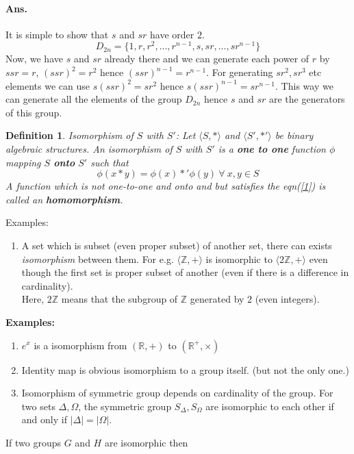 \documentclass[12pt]{report}
\newtheorem{defn}{Definition}
\begin{document}
\paragraph*{Ans. } It is simple to show that $s$ and $sr$ have order $2$. 
$$ D_{2n} = \{1, r, r^2, \dots, r^{n-1}, s, sr, \dots, sr^{n-1}\}$$
Now, we have $s$ and $sr$ already there and we can generate each power of $r$ by $ssr = r$, $(ssr)^2 = r^2$ hence $(ssr)^{n-1} = r^{n-1}$. For generating $sr^2, sr^3$ etc elements we can use $s(ssr)^2 = sr^2$ hence $s(ssr)^{n-1} = sr^{n-1}$. This way we can generate all the elements of the group $D_{2n}$ hence $s$ and $sr$ are the generators of this group.
\begin{defn}
    Isomorphism of $S$ with $S'$: Let $\langle S, *\rangle$ and $\langle S', *'\rangle$ be binary algebraic structures. An isomorphism of $S$ with $S'$ is a \textbf{one to one }function $\phi$ mapping $S$ \textbf{onto} $S'$ such that
    \begin{equation} \label{1}
        \phi(x * y) = \phi(x) *' \phi(y)~\forall~ x,y \in S
    \end{equation}
    A function which is not one-to-one and onto and but satisfies the eqn(\ref{1}) is called an \textbf{homomorphism}.
\end{defn}
Examples:
\begin{enumerate}
    \item A set which is subset (even proper subset) of another set, there can exists {\em isomorphism} between them. For e.g. $\langle \mathbb{Z}, + \rangle$ is isomorphic to $\langle 2\mathbb{Z}, + \rangle$ even though the first set is proper subset of another (even if there is a difference in cardinality).\\
    Here, $2\mathbb{Z}$ means that the subgroup of $\mathbb{Z}$ generated by $2$ (even integers).
\end{enumerate} 
\textbf{Examples:}
\begin{enumerate}
    \item $e^x$ is a isomorphism from $(\mathbb{R},+)$ to $(\mathbb{R^+},\times)$
    \item Identity map is obvious isomorphism to a group itself. (but not the only one.)
    \item Isomorphism of symmetric group depends on cardinality of the group. For two sets $\Delta , \Omega$, the symmetric group $S_{\Delta}, S_{\Omega}$ are isomorphic to each other if and only if $|\Delta| = |\Omega|$.
\end{enumerate}
If two groups $G$ and $H$ are isomorphic then
\end{document}
